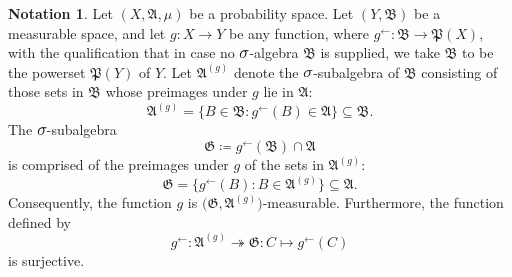 \documentclass[
twoside=true,
paper=letter,
fontsize=9pt,
pagesize=auto,
leqno,
openany,
headsepline,
overfullrule,
]{scrbook}
\theoremstyle{plain}
\theoremstyle{plain}
\theoremstyle{definition}
\newtheorem{notn}[thm]{Notation}
\theoremstyle{bfnoteitalic}
\theoremstyle{bfnoteroman}
\newcommand{\sigalg}[1]{\mathfrak{#1}}
\newcommand{\definedby}{\coloneqq}
\newcommand{\textsigma}{\hbox{\large{$\sigma$}}\kern-1pt}
\newcommand{\preimage}[1]{#1^{\leftarrow}}
\newcommand{\meets}{\cap}
\newcommand{\sigmaalgebra}{\sigalg{A}}
\newcommand{\sigmaalgebraii}{\sigalg{B}}
\newcommand{\powerset}{\mathfrak{P}}
\newcommand{\functionii}{g}
\newcommand{\measurespace}{X}
\newcommand{\measurespaceii}{Y}
\newcommand{\measure}{\mu}
\begin{document}
\begin{notn}
Let $(\measurespace, \sigmaalgebra,\measure)$ be a probability space.
Let $(\measurespaceii, \sigmaalgebraii)$ be a measurable space, and let $\functionii:\measurespace\to\measurespaceii$ be any function, where $\preimage{\functionii}:\sigmaalgebraii\to\powerset(\measurespace)$,
with the qualification that in case no $\textsigma$-algebra $\sigmaalgebraii$ is supplied, we take $\sigmaalgebraii$ to be the powerset $\powerset(\measurespaceii)$ of $\measurespaceii$. 
Let $\sigmaalgebra^{(\functionii)}$ denote the $\textsigma$-subalgebra of $\sigmaalgebraii$ consisting of those sets in $\sigmaalgebraii$ whose preimages under $\functionii$ lie in $\sigmaalgebra$:
\[
\sigmaalgebra^{(\functionii)}
=
\{ B\in \sigmaalgebraii : \preimage{\functionii}(B)\in \sigmaalgebra \} 
\subseteq \sigmaalgebraii.
\]
The $\textsigma$-subalgebra
\[
\sigalg{G}\definedby
\preimage{\functionii}(\sigmaalgebraii)\meets\sigmaalgebra
\]
is comprised of the preimages under $\functionii$ of the sets in $\sigmaalgebra^{(\functionii)}$:
\[
\sigalg{G}
=
\bigl\{ \preimage{\functionii}(B) : B \in \sigmaalgebra^{(\functionii)} \bigr\} 
\subseteq \sigmaalgebra.
\]
Consequently, the function $\functionii$ is
$\bigl(\sigalg{G}, \sigmaalgebra^{(\functionii)}\bigr)$\hyp{}measurable. Furthermore, the function defined by
\[
\preimage{\functionii}:\sigmaalgebra^{(\functionii)} 
\twoheadrightarrow
\sigalg{G}:
C \mapsto \preimage{\functionii}(C)
\]
is surjective.
\end{notn}
\end{document}
